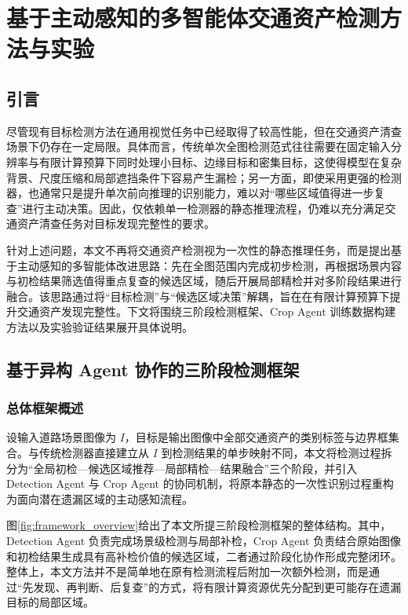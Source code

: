 \chapter{基于主动感知的多智能体交通资产检测方法与实验}
\label{chap:method_detection}

\section{引言}

尽管现有目标检测方法在通用视觉任务中已经取得了较高性能，但在交通资产清查场景下仍存在一定局限。具体而言，传统单次全图检测范式往往需要在固定输入分辨率与有限计算预算下同时处理小目标、边缘目标和密集目标，这使得模型在复杂背景、尺度压缩和局部遮挡条件下容易产生漏检；另一方面，即使采用更强的检测器，也通常只是提升单次前向推理的识别能力，难以对“哪些区域值得进一步复查”进行主动决策。因此，仅依赖单一检测器的静态推理流程，仍难以充分满足交通资产清查任务对目标发现完整性的要求。

针对上述问题，本文不再将交通资产检测视为一次性的静态推理任务，而是提出基于主动感知的多智能体改进思路：先在全图范围内完成初步检测，再根据场景内容与初检结果筛选值得重点复查的候选区域，随后开展局部精检并对多阶段结果进行融合。该思路通过将“目标检测”与“候选区域决策”解耦，旨在在有限计算预算下提升交通资产发现完整性。下文将围绕三阶段检测框架、Crop Agent 训练数据构建方法以及实验验证结果展开具体说明。


\section{基于异构 Agent 协作的三阶段检测框架}
\label{sec:three_stage_framework}

\subsection{总体框架概述}

设输入道路场景图像为 $I$，目标是输出图像中全部交通资产的类别标签与边界框集合。与传统检测器直接建立从 $I$ 到检测结果的单步映射不同，本文将检测过程拆分为“全局初检—候选区域推荐—局部精检—结果融合”三个阶段，并引入 Detection Agent 与 Crop Agent 的协同机制，将原本静态的一次性识别过程重构为面向潜在遗漏区域的主动感知流程。

图\ref{fig:framework_overview}给出了本文所提三阶段检测框架的整体结构。其中，Detection Agent 负责完成场景级检测与局部补检，Crop Agent 负责结合原始图像和初检结果生成具有高补检价值的候选区域，二者通过阶段化协作形成完整闭环。整体上，本文方法并不是简单地在原有检测流程后附加一次额外检测，而是通过“先发现、再判断、后复查”的方式，将有限计算资源优先分配到更可能存在遗漏目标的局部区域。

